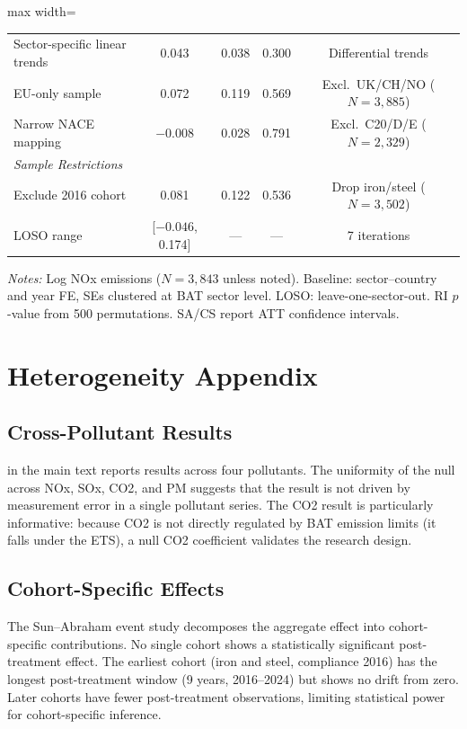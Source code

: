 \documentclass[12pt]{article}
\begin{document}
\begin{table}[H]
\begin{adjustbox}{max width=\textwidth}
\begin{tabular}{lcccc}
Sector-specific linear trends & 0.043 & 0.038 & 0.300 & Differential trends \\
EU-only sample & 0.072 & 0.119 & 0.569 & Excl.\ UK/CH/NO ($N\!=\!3{,}885$) \\
Narrow NACE mapping & $-0.008$ & 0.028 & 0.791 & Excl.\ C20/D/E ($N\!=\!2{,}329$) \\
\midrule
\multicolumn{5}{l}{\emph{Sample Restrictions}} \\
Exclude 2016 cohort & 0.081 & 0.122 & 0.536 & Drop iron/steel ($N\!=\!3{,}502$) \\
LOSO range & [$-0.046$, 0.174] & --- & --- & 7 iterations \\
\bottomrule
\end{tabular}
\end{adjustbox}
\par\vspace{0.3em}
{\footnotesize \emph{Notes:} Log NOx emissions ($N=3{,}843$ unless noted). Baseline: sector--country and year FE, SEs clustered at BAT sector level. LOSO: leave-one-sector-out. RI $p$-value from 500 permutations. SA/CS report ATT confidence intervals.}
\end{table}


\section{Heterogeneity Appendix}
\label{sec:het_appendix}

\subsection{Cross-Pollutant Results}

 in the main text reports results across four pollutants. The uniformity of the null across NOx, SOx, CO2, and PM suggests that the result is not driven by measurement error in a single pollutant series. The CO2 result is particularly informative: because CO2 is not directly regulated by BAT emission limits (it falls under the ETS), a null CO2 coefficient validates the research design.

\subsection{Cohort-Specific Effects}

The Sun--Abraham event study decomposes the aggregate effect into cohort-specific contributions. No single cohort shows a statistically significant post-treatment effect. The earliest cohort (iron and steel, compliance 2016) has the longest post-treatment window (9 years, 2016--2024) but shows no drift from zero. Later cohorts have fewer post-treatment observations, limiting statistical power for cohort-specific inference.
\end{document}
